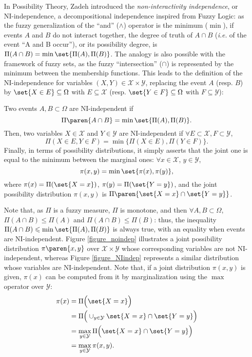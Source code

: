 In Possibility Theory, Zadeh \cite{Zadeh75theconcept} introduced the \textit{non-interactivity independence},
or NI-independence, 
a decompositional independence inspired from Fuzzy Logic:
as the fuzzy generalization of the ``and'' ($\wedge$) operator is the minimum ($\min$),
if events $A$ and $B$ do not interact together,
the degree of truth of $A \cap B$ (\textit{i.e.} of the event ``A and B occur''), 
or its possibility degree,
is $\Pi(A \cap B) = \min \set{ \Pi(A), \Pi(B) }$.
The analogy is also possible with the framework of fuzzy sets,
as the fuzzy ``intersection'' ($\cap$) is represented 
by the minimum between the membership functions.
This leads to the definition of the NI-independence for variables $(X,Y) \in \mathcal{X} \times \mathcal{Y}$,
replacing the event $A$ (resp. $B$) by $\set{ X \in E } \subseteq \Omega$
with $E \subseteq \mathcal{X}$ (resp. $\set{ Y \in F } \subseteq \Omega$
with $F \subseteq \mathcal{Y}$): 
\begin{Def}
\label{def_NIindep}
Two events $A,B \subset \Omega$ are NI-independent if
\[ \Pi \paren{ A \cap B } = \min \set{ \Pi(A), \Pi(B) }. \]
Then, two variables $X \in \mathcal{X}$ and $Y \in \mathcal{Y}$ are NI-independent if  $\forall E \subset \mathcal{X}, F \subset \mathcal{Y}$,
\[  \Pi(X \in E, Y \in F ) = \min \Big\{ \Pi(X \in E), \Pi(Y \in F)  \Big\}. \] 
Finally, in terms of possibility distributions, 
it simply asserts that the joint one is equal to the minimum
between the marginal ones: $\forall x \in \mathcal{X}$, $y \in \mathcal{Y}$,
\[ \pi(x,y) = \min \set{ \pi(x), \pi(y) },  \]
where $\pi(x) = \Pi( \set{X = x} )$, $\pi(y) = \Pi( \set{Y = y} )$, and the joint possibility distribution $\pi(x,y)$ 
is $\Pi \paren{ \set{X=x} \cap \set{Y=y} }$.
\end{Def}
Note that, as $\Pi$ is a fuzzy measure, $\Pi$ is monotone, 
and then $\forall A,B \subset \Omega$,
$\Pi(A \cap B) \leqslant \Pi(A)$ and $\Pi(A \cap B) \leqslant \Pi(B)$:
thus, the inequality $\Pi(A \cap B) \leqslant \min \set{ \Pi(A), \Pi(B) }$ is always true,
with an equality when events are NI-independent.
Figure \ref{figure_noindep} illustrates a joint possibility distribution $\pi \paren{ x,y }$
over $\mathcal{X} \times \mathcal{Y}$ whose corresponding variables are not NI-independent,
whereas Figure \ref{figure_NIindep} represents a similar distribution whose variables are NI-independent.
Note that, if a joint distribution $\pi(x,y)$ is given, $\pi(x)$ can be computed from it
by marginalization using the $\max$ operator over $\mathcal{Y}$:
\begin{align*}
\pi(x)&=\Pi\Big( \set{X=x} \Big)\\ 
&=\Pi\Big( \displaystyle \cup_{y\in\mathcal{Y}} \set{ X = x } \cap \set{ Y = y } \Big) \\ 
&= \max_{y \in \mathcal{Y}} \Pi \Big( \set{ X = x } \cap \set{ Y = y } \Big) \\
&= \max_{y \in \mathcal{Y}} \pi(x,y).
\end{align*}


